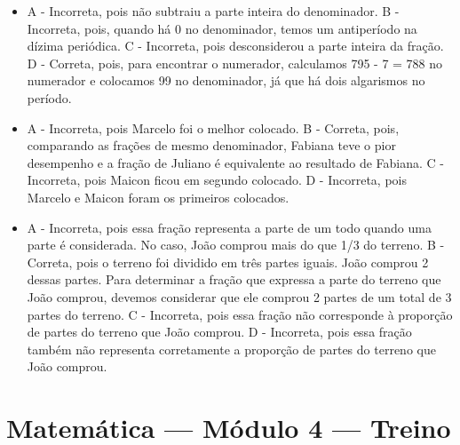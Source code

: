 \begin{itemize}
	\item A - Incorreta, pois não subtraiu a parte inteira do denominador.
B - Incorreta, pois, quando há 0 no denominador, temos um antiperíodo na
dízima periódica.
C - Incorreta, pois desconsiderou a parte inteira da fração.
D - Correta, pois, para encontrar o numerador, calculamos 795 - 7 = 788
no numerador e colocamos 99 no denominador, já que há dois algarismos no
período.
\item A - Incorreta, pois Marcelo foi o melhor colocado.
B - Correta, pois, comparando as frações de mesmo denominador, Fabiana
teve o pior desempenho e a fração de Juliano é equivalente ao resultado
de Fabiana.
C - Incorreta, pois Maicon ficou em segundo colocado.
D - Incorreta, pois Marcelo e Maicon foram os primeiros colocados.
\item A - Incorreta, pois essa fração representa a parte de um todo quando uma
parte é considerada. No caso, João comprou mais do que 1/3 do terreno.
B - Correta, pois o terreno foi dividido em três partes iguais. João
comprou 2 dessas partes. Para determinar a fração que expressa a parte
do terreno que João comprou, devemos considerar que ele comprou 2 partes
de um total de 3 partes do terreno.
C - Incorreta, pois essa fração não corresponde à proporção de partes do
terreno que João comprou.
D - Incorreta, pois essa fração também não representa corretamente a
proporção de partes do terreno que João comprou.
\end{itemize}

\section*{Matemática — Módulo 4 — Treino}

